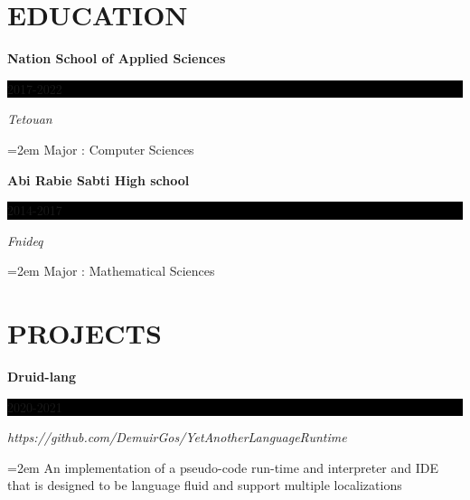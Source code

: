 \documentclass[paper=a4,fontsize=11pt]{scrartcl} %
\newcommand{\NewPart}[1]{\section*{\uppercase{#1}}}
\newcommand{\EducationEntry}[4]{
		\noindent \textbf{#1} \hfill      %
		\colorbox{Black}{%
			\parbox{6em}{%
			\hfill\color{White}#2}} \par  %
		\noindent \textit{#3} \par        %
		\noindent\hangindent=2em\hangafter=0 \small #4 %
		\normalsize \par}
\begin{document}
\NewPart{Education}{}

\EducationEntry{Nation School of Applied Sciences }{2017-2022}{Tetouan}{Major : Computer Sciences}

\EducationEntry{Abi Rabie Sabti High school}{2014-2017}{Fnideq}{Major : Mathematical Sciences}


\NewPart{Projects}{}

\EducationEntry{Druid-lang}{2020-2021}{https://github.com/DemuirGos/YetAnotherLanguageRuntime}{An implementation of a pseudo-code run-time and interpreter and IDE that is designed to be language fluid and support multiple localizations}
\end{document}
